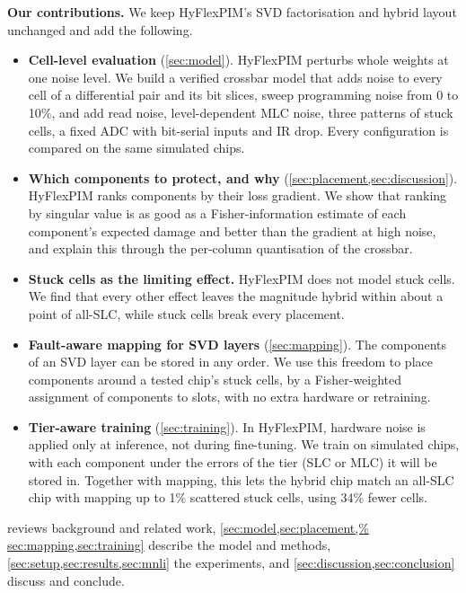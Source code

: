 \textbf{Our contributions.} We keep HyFlexPIM's SVD factorisation and hybrid layout unchanged and add the
following.
\begin{itemize}
\item \textbf{Cell-level evaluation} (\cref{sec:model}). HyFlexPIM perturbs whole weights at one noise
level. We build a verified crossbar model that adds noise to every cell of a differential pair and its bit
slices, sweep programming noise from 0 to 10\%, and add read noise, level-dependent MLC noise, three
patterns of stuck cells, a fixed ADC with bit-serial inputs and IR drop. Every configuration is compared
on the same simulated chips.

\item \textbf{Which components to protect, and why} (\cref{sec:placement,sec:discussion}). HyFlexPIM ranks
components by their loss gradient. We show that ranking by singular value is as good as a
Fisher-information estimate of each component's expected damage and better than the gradient at high
noise, and explain this through the per-column quantisation of the crossbar.

\item \textbf{Stuck cells as the limiting effect.} HyFlexPIM does not model stuck cells. We find that every
other effect leaves the magnitude hybrid within about a point of all-SLC, while stuck cells break every
placement.

\item \textbf{Fault-aware mapping for SVD layers} (\cref{sec:mapping}). The components of an SVD layer can
be stored in any order. We use this freedom to place components around a tested chip's stuck cells, by a
Fisher-weighted assignment of components to slots, with no extra hardware or retraining.

\item \textbf{Tier-aware training} (\cref{sec:training}). In HyFlexPIM, hardware noise is applied only at
inference, not during fine-tuning. We train on simulated chips, with each component under the errors of the tier (SLC or MLC) it
will be stored in. Together with mapping, this lets the hybrid chip match an all-SLC chip with mapping up
to 1\% scattered stuck cells, using 34\% fewer cells.
\end{itemize}

 reviews background and related work, \cref{sec:model,sec:placement,%
sec:mapping,sec:training} describe the model and methods, \cref{sec:setup,sec:results,sec:mnli} the experiments,
and \cref{sec:discussion,sec:conclusion} discuss and conclude.
